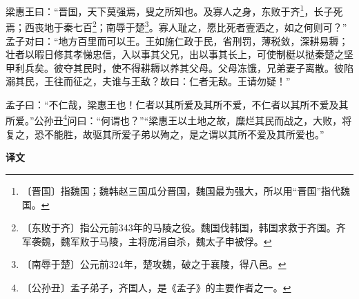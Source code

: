 \documentclass[12pt,UTF-8,openany,a4]{ctexbook}
\begin{document}
\begin{large}
    梁惠王曰：“晋国，天下莫强焉，叟之所知也。及寡人之身，东败于齐\footnote{〔晋国〕\yiwen 指魏国；魏韩赵三国瓜分晋国，魏国最为强大，所以用“晋国”指代魏国。}，长子死焉；西丧地于秦七百\footnote{〔东败于齐〕\yiwen 指公元前343年的马陵之役。魏国伐韩国，韩国求救于齐国。齐军袭魏，魏军败于马陵，主将庞涓自杀，魏太子申被俘。}；南辱于楚\footnote{〔南辱于楚〕\yiwen 公元前324年，楚攻魏，破之于襄陵，得八邑。}。寡人耻之，愿比死者壹洒之，如之何则可？” 孟子对曰：“地方百里而可以王。王如施仁政于民，省刑罚，薄税敛，深耕易耨；壮者以暇日修其孝悌忠信，入以事其父兄，出以事其长上，可使制梃以挞秦楚之坚甲利兵矣。彼夺其民时，使不得耕耨以养其父母。父母冻饿，兄弟妻子离散。彼陷溺其民，王往而征之，夫谁与王敌？故曰：仁者无敌。王请勿疑！”
    
    孟子曰：“不仁哉，梁惠王也！仁者以其所爱及其所不爱，不仁者以其所不爱及其所爱。”公孙丑\footnote{〔公孙丑〕\yiwen 孟子弟子，齐国人，是《孟子》的主要作者之一。}问曰：“何谓也？”“梁惠王以土地之故，糜烂其民而战之，大败，将复之，恐不能胜，故驱其所爱子弟以殉之，是之谓以其所不爱及其所爱也。”
\end{large}


\newpage

\begin{Large}
    \noindent\textbf{译文}
\end{Large}


\vspace{1em}
\end{document}
